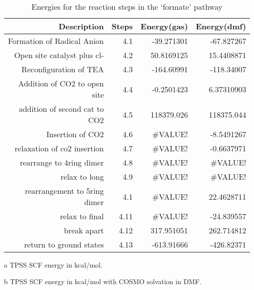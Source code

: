 \begin{table}[!htb]
\centering
 \begin{threeparttable}
  \caption{Energies for the reaction steps in the `formate' pathway}
    \begin{tabular}{rrrr}
    \toprule
    Description & Steps & Energy(gas)\tnote{a} & Energy(dmf)\tnote{b} \\
    \midrule
    Formation of Radical Anion & 4.1   & -39.271301 & -67.827267 \\
    Open site catalyst plus cl- & 4.2   & 50.8169125 & 15.4408871 \\
    Reconfiguration of TEA & 4.3   & -164.60991 & -118.34007 \\
    \midrule
    Addition of CO2 to open site & 4.4   & -0.2501423 & 6.37310903 \\
    addition of second cat to CO2 & 4.5   & 118379.026 & 118375.044 \\
    Insertion of CO2 & 4.6   & \#VALUE! & -8.5491267 \\
    relaxation of co2 insertion & 4.7   & \#VALUE! & -0.6637971 \\
    rearrange to 4ring dimer & 4.8   & \#VALUE! & \#VALUE! \\
    relax to long & 4.9   & \#VALUE! & \#VALUE! \\
    rearrangement to 5ring dimer & 4.1   & \#VALUE! & 22.4628711 \\
    relax to final & 4.11  & \#VALUE! & -24.839557 \\
    break apart & 4.12  & 317.951051 & 262.714812 \\
    return to ground states & 4.13  & -613.91666 & -426.82371 \\
    \bottomrule
    \end{tabular}%
    \begin{tablenotes}
    \item [a] TPSS SCF energy in kcal/mol.
    \item [b] TPSS SCF energy in kcal/mol with COSMO solvation in DMF.
    \end{tablenotes}
  \label{tab.carbrxn}%
 \end{threeparttable}
\end{table}%
